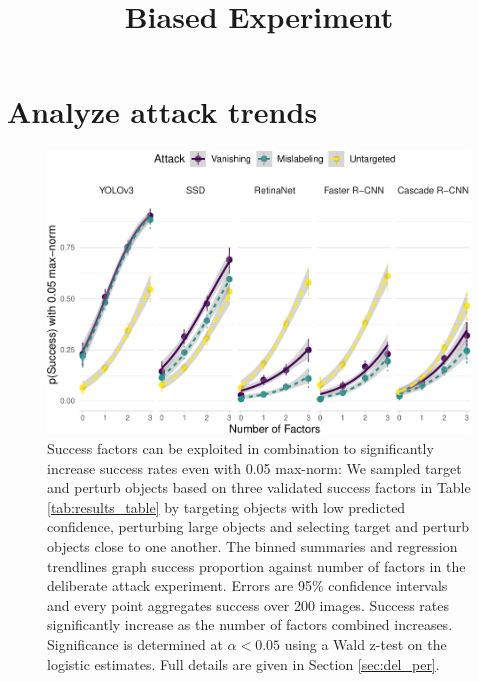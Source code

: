 \documentclass[
]{article}
\title{Biased Experiment}
\author{}
\date{\vspace{-2.5em}}
\begin{document}
\maketitle

\section{Analyze attack trends}\label{analyze-attack-trends}

\begin{figure}[tb]

{\centering \includegraphics[width=1\linewidth]{imgs-normed/biased_trend_graph-1} 

}

\caption{Success factors can be exploited in combination to significantly increase success rates even with 0.05 max-norm:  We sampled target and perturb objects based on three validated success factors in Table \ref{tab:results_table} by targeting objects with low predicted confidence, perturbing large objects and selecting target and perturb objects close to one another. The binned summaries and regression trendlines graph success proportion against number of factors in the deliberate attack experiment. Errors are 95\% confidence intervals and every point aggregates success over 200 images. Success rates significantly increase as the number of factors combined increases. Significance is determined at $\alpha < 0.05$ using a Wald z-test on the logistic estimates. Full details are given in Section \ref{sec:del_per}.}\label{fig:biased_trend_graph}
\end{figure}

\begingroup\fontsize{9}{11}\selectfont
\end{document}
